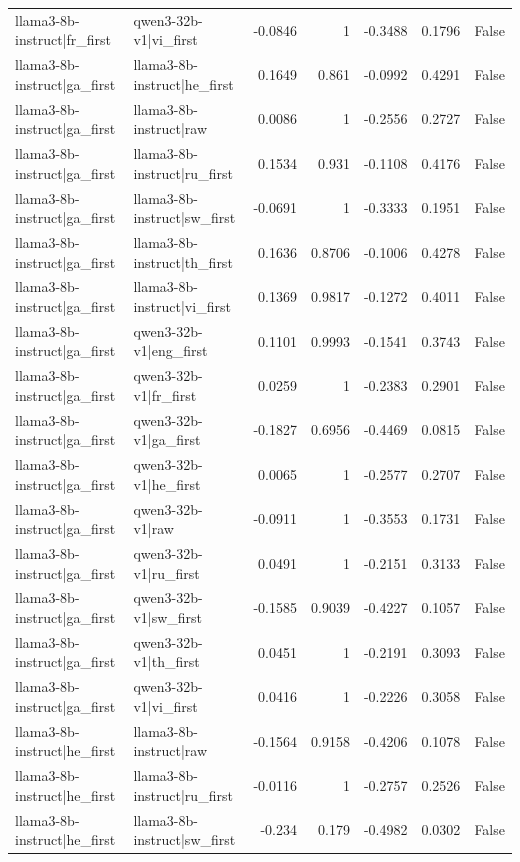\begin{table}
\begin{tabular}{l l r r r r l}
llama3-8b-instruct|fr_first & qwen3-32b-v1|vi_first & -0.0846 & 1 & -0.3488 & 0.1796 & False \\
llama3-8b-instruct|ga_first & llama3-8b-instruct|he_first & 0.1649 & 0.861 & -0.0992 & 0.4291 & False \\
llama3-8b-instruct|ga_first & llama3-8b-instruct|raw & 0.0086 & 1 & -0.2556 & 0.2727 & False \\
llama3-8b-instruct|ga_first & llama3-8b-instruct|ru_first & 0.1534 & 0.931 & -0.1108 & 0.4176 & False \\
llama3-8b-instruct|ga_first & llama3-8b-instruct|sw_first & -0.0691 & 1 & -0.3333 & 0.1951 & False \\
llama3-8b-instruct|ga_first & llama3-8b-instruct|th_first & 0.1636 & 0.8706 & -0.1006 & 0.4278 & False \\
llama3-8b-instruct|ga_first & llama3-8b-instruct|vi_first & 0.1369 & 0.9817 & -0.1272 & 0.4011 & False \\
llama3-8b-instruct|ga_first & qwen3-32b-v1|eng_first & 0.1101 & 0.9993 & -0.1541 & 0.3743 & False \\
llama3-8b-instruct|ga_first & qwen3-32b-v1|fr_first & 0.0259 & 1 & -0.2383 & 0.2901 & False \\
llama3-8b-instruct|ga_first & qwen3-32b-v1|ga_first & -0.1827 & 0.6956 & -0.4469 & 0.0815 & False \\
llama3-8b-instruct|ga_first & qwen3-32b-v1|he_first & 0.0065 & 1 & -0.2577 & 0.2707 & False \\
llama3-8b-instruct|ga_first & qwen3-32b-v1|raw & -0.0911 & 1 & -0.3553 & 0.1731 & False \\
llama3-8b-instruct|ga_first & qwen3-32b-v1|ru_first & 0.0491 & 1 & -0.2151 & 0.3133 & False \\
llama3-8b-instruct|ga_first & qwen3-32b-v1|sw_first & -0.1585 & 0.9039 & -0.4227 & 0.1057 & False \\
llama3-8b-instruct|ga_first & qwen3-32b-v1|th_first & 0.0451 & 1 & -0.2191 & 0.3093 & False \\
llama3-8b-instruct|ga_first & qwen3-32b-v1|vi_first & 0.0416 & 1 & -0.2226 & 0.3058 & False \\
llama3-8b-instruct|he_first & llama3-8b-instruct|raw & -0.1564 & 0.9158 & -0.4206 & 0.1078 & False \\
llama3-8b-instruct|he_first & llama3-8b-instruct|ru_first & -0.0116 & 1 & -0.2757 & 0.2526 & False \\
llama3-8b-instruct|he_first & llama3-8b-instruct|sw_first & -0.234 & 0.179 & -0.4982 & 0.0302 & False \\

\end{tabular}
\end{table}

